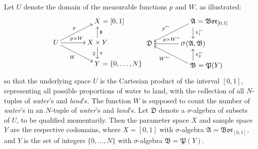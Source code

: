 \documentclass[
twoside=true,
paper=letter,
fontsize=9pt,
pagesize=auto,
leqno,
openany,
headsepline,
overfullrule,
]{scrbook}
\theoremstyle{plain}
\theoremstyle{plain}
\theoremstyle{definition}
\theoremstyle{bfnoteitalic}
\theoremstyle{bfnoteroman}
\newcommand{\sigalg}[1]{\mathfrak{#1}}
\newcommand{\borel}{\mathfrak{Bor}}
\newcommand{\sagb}{\mathop{\hbox{\large{$\sigma$}}}\nolimits}
\newcommand{\textsigma}{\hbox{\large{$\sigma$}}\kern-1pt}
\newcommand{\preimage}[1]{#1^{\leftarrow}}
\newcommand{\productsig}[2]{\sagb(#1,#2)}
\newcommand{\powerset}{\mathfrak{P}}
\newcommand{\measurespace}{X}
\newcommand{\measurespaceii}{Y}
\newcommand{\projectionone}{\pi_1}
\newcommand{\projectiontwo}{\pi_2}
\newcommand{\pspace}{\measurespace}%
\newcommand{\sspace}{\measurespaceii}%
\newcommand{\sspacesig}{\sigalg{B}}
\newcommand{\pspacesig}{\sigalg{A}}
\begin{document}
Let $U$ denote the domain of the measurable functions $p$ and $W$, as illustrated:
\[
\xymatrix@R=16pt@C=35pt{
 & \pspace \makebox[0pt][l]{$\ = [0,1]$}
 \\
 U
 \ar[ur]^{\makebox[0pt][r]{\scriptsize{$p$}}}
 \ar[dr]_{\makebox[0pt][r]{\scriptsize{$W$}}}
 \ar[r]^{p\times W} &
 \pspace\times\sspace \ar[u]_\projectionone \ar[d]^\projectiontwo
 \\
  & \sspace\rlap{ $=\{0,\ldots,N\}$} \\
}
%
\hspace{50pt}
%
\xymatrix@R=16pt@C=35pt{
 & \pspacesig \rlap{ $=\borel_{[0,1]}$}
 \ar[dl]_{\makebox[0pt][r]{\scriptsize{$\preimage{p}$}}}
 \ar[d]^{\preimage{\projectionone}}
 \\
 \sigalg{D}  & 
 \productsig{\pspacesig}{\sspacesig} 
 \ar[l]_{\ \preimage{p\times W}}
 \\
  & \sspacesig \rlap{ $=\powerset(\sspace)$}
  \ar[u]_{\preimage{\projectiontwo}}
  \ar[ul]^{\makebox[0pt][r]{\scriptsize{$\preimage{W}$}}}
  \\
}
\]
so that the underlying space  $U$ is the Cartesian product of the interval $[0,1]$, representing all possible proportions of water to land, with the collection of all $N$-tuples of \textit{water}'s and \textit{land}'s. The function $W$ is supposed to count the number of \textit{water}'s in an $N$-tuple of \textit{water}'s and \textit{land}'s.  Let 
$\sigalg{D}$ denote a \textsigma-algebra of subsets of $U$, to be qualified momentarily. Then 
the parameter space $\pspace$ and 
sample space $\sspace$ 
are the respective codomains, where $\pspace=[0,1]$ with \textsigma-algebra 
$\pspacesig = \borel_{[0,1]}$, and 
$\sspace$ is the set of integers $\{0,\ldots,N\}$ with \textsigma-algebra
$\sspacesig=\powerset(\sspace)$.
\end{document}

